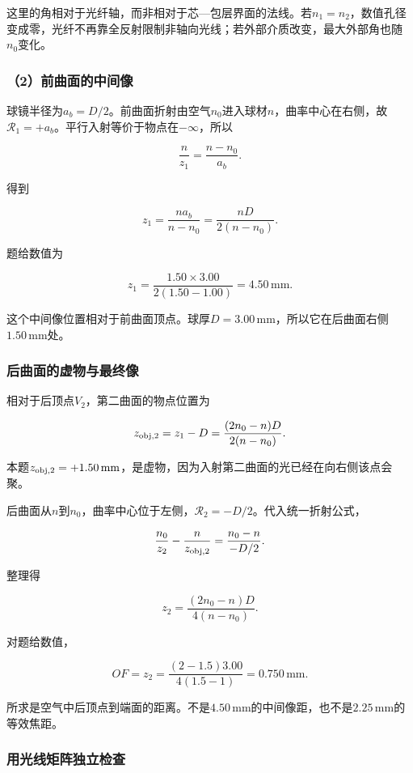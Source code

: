 \documentclass[12pt,a4paper,fontset=fandol]{ctexart}
\begin{document}
这里的角相对于光纤轴，而非相对于芯---包层界面的法线。若\(n_1=n_2\)，数值孔径变成零，光纤不再靠全反射限制非轴向光线；若外部介质改变，最大外部角也随\(n_0\)变化。

\subsubsection{（2）前曲面的中间像}\label{ux524dux66f2ux9762ux7684ux4e2dux95f4ux50cf}

球镜半径为\(a_b=D/2\)。前曲面折射由空气\(n_0\)进入球材\(n\)，曲率中心在右侧，故\(\mathcal R_1=+a_b\)。平行入射等价于物点在\(-\infty\)，所以

\[
\frac{n}{z_1}
=\frac{n-n_0}{a_b}.
\]

得到

\[
\boxed{
z_1=\frac{na_b}{n-n_0}
=\frac{nD}{2(n-n_0)}}.
\]

题给数值为

\[
z_1=\frac{1.50\times3.00}
{2(1.50-1.00)}
=4.50\,\mathrm{mm}.
\]

这个中间像位置相对于前曲面顶点。球厚\(D=3.00\,\mathrm{mm}\)，所以它在后曲面右侧\(1.50\,\mathrm{mm}\)处。

\subsubsection{后曲面的虚物与最终像}\label{ux540eux66f2ux9762ux7684ux865aux7269ux4e0eux6700ux7ec8ux50cf}

相对于后顶点\(V_2\)，第二曲面的物点位置为

\[
z_{\rm obj,2}=z_1-D
=\frac{(2n_0-n)D}{2(n-n_0)}.
\]

本题\(z_{\rm obj,2}=+1.50\,\mathrm{mm}\)，是虚物，因为入射第二曲面的光已经在向右侧该点会聚。

后曲面从\(n\)到\(n_0\)，曲率中心位于左侧，\(\mathcal R_2=-D/2\)。代入统一折射公式，

\[
\frac{n_0}{z_2}
-\frac{n}{z_{\rm obj,2}}
=\frac{n_0-n}{-D/2}.
\]

整理得

\[
\boxed{
z_2=\frac{(2n_0-n)D}{4(n-n_0)}}.
\]

对题给数值，

\[
\boxed{
OF=z_2=\frac{(2-1.5)3.00}{4(1.5-1)}
=0.750\,\mathrm{mm}}.
\]

所求是空气中后顶点到端面的距离。不是\(4.50\,\mathrm{mm}\)的中间像距，也不是\(2.25\,\mathrm{mm}\)的等效焦距。

\subsubsection{用光线矩阵独立检查}\label{ux7528ux5149ux7ebfux77e9ux9635ux72ecux7acbux68c0ux67e5}
\end{document}
